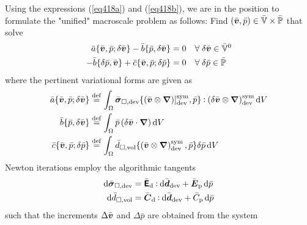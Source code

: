 \documentclass[10pt,a4paper]{article}
\newcommand{\ded}{\mathrm{d}}
\newcommand{\dep}{\mathrm{p}}
\begin{document}
Using the expressions (\ref{eq418a}) and (\ref{eq418b}), we are in the position to formulate the "unified" macroscale problem as follows: Find $(\bar{\boldsymbol{v}},\bar p) \in\bar{\mathbb{V}}\times\bar{\mathbb{P}}$ that solve
\begin{align}
 \bar a\{\bar{\boldsymbol{v}},\bar p; \delta\bar{\boldsymbol{v}}\} - \bar b\{\bar p, \delta\bar{\boldsymbol{v}}\} &= 0   \quad \forall\; \delta\bar{\boldsymbol{v}} \in \bar{\mathbb{V}}^0
 \label{eq411a}\\
 - \bar b\{\delta\bar p, \bar{\boldsymbol{v}}\} + \bar c\{\bar{\boldsymbol{v}}, \bar p; \delta\bar p\}&= 0   \quad \forall\; \delta\bar p \in \bar{\mathbb{P}}
 \label{eq411b}
\end{align}
where the pertinent variational forms are given as
\begin{align}
 \bar a\{\bar{\boldsymbol{v}},\bar p; \delta\bar{\boldsymbol{v}}\} &\overset{\mathrm{def}}{=} \int_\Omega \bar{\boldsymbol{\sigma}}_{\Box,\mathrm{dev}}\{\left(\bar{\boldsymbol{v}}\mathbin{\otimes} \boldsymbol{\nabla}\right)]^{\mathrm{sym}}_{\mathrm{dev}},\bar p\}\mathbin{\vcentcolon} \left(\delta\bar{\boldsymbol{v}}\mathbin{\otimes} \boldsymbol{\nabla}\right)^{\mathrm{sym}}_{\mathrm{dev}} \operatorname{d \!} V
 \label{eq412a}\\
 \bar b\{\bar p, \delta\bar{\boldsymbol{v}}\}             &\overset{\mathrm{def}}{=} \int_\Omega \bar p\left(\delta\bar{\boldsymbol{v}}\cdot\boldsymbol{\nabla}\right)\operatorname{d \!} V
 \label{eq412b}\\
 \bar c\{\bar{\boldsymbol{v}}, \bar p; \delta\bar p\}     &\overset{\mathrm{def}}{=} \int_\Omega \bar d_{\Box,\mathrm{vol}}\{\left(\bar{\boldsymbol{v}}\mathbin{\otimes} \boldsymbol{\nabla}\right)^{\mathrm{sym}}_{\mathrm{dev}},\bar p\}\delta\bar p\operatorname{d \!} V
 \label{eq412c}
\end{align}
Newton iterations employ the algorithmic tangents
\begin{align}
 \dif \bar{\ts\sigma}_{\Box,\dev} &= \bar{\tf E}_\ded \dprod \dif\bar{\ts d}_\dev + \bar{\ts E}_\dep \dif\bar{p}
 \label{eq413a} \\
 \dif \bar{d}_{\Box,\vol} &= \bar{\ts C}_\ded \dprod \dif \bar{\ts d}_\dev + \bar{C}_\dep \dif\bar{p}
 \label{eq413b}
\end{align}
such that the increments $\Delta\bar{\boldsymbol{v}}$ and $\Delta\bar{p}$ are obtained from the system
\end{document}
